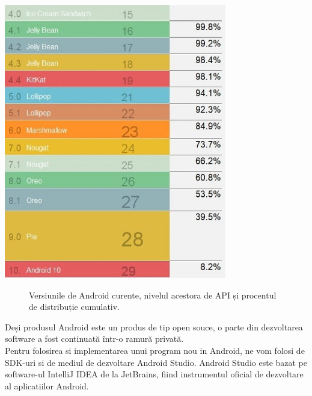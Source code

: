 \documentclass{article}
\begin{document}
		\begin{center}
			\includegraphics[scale=0.6]{Source/AndroidVersions}
		\begin{figure}[!h]
			{\caption*{Versiunile de Android curente, nivelul acestora de API și procentul de distribuție cumulativ.}}
		\end{figure}
		\end{center}

	Deși produsul Android este un produs de tip open souce, o parte din dezvoltarea software a fost continuată într-o ramură privată. \\

	Pentru folosirea si implementarea unui program nou in Android, ne vom folosi de SDK-uri si de mediul de dezvoltare Android Studio. Android Studio este bazat pe software-ul IntelliJ IDEA de la JetBrains, fiind instrumentul oficial de dezvoltare al aplicatiilor Android. \\
\end{document}
